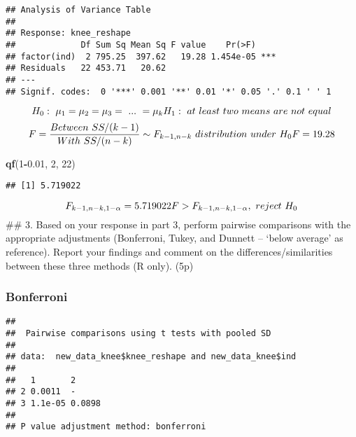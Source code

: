 \documentclass[]{article}
\newenvironment{Shaded}{\begin{snugshade}}{\end{snugshade}}
\newcommand{\KeywordTok}[1]{\textcolor[rgb]{0.13,0.29,0.53}{\textbf{#1}}}
\newcommand{\DataTypeTok}[1]{\textcolor[rgb]{0.13,0.29,0.53}{#1}}
\newcommand{\DecValTok}[1]{\textcolor[rgb]{0.00,0.00,0.81}{#1}}
\newcommand{\FloatTok}[1]{\textcolor[rgb]{0.00,0.00,0.81}{#1}}
\newcommand{\StringTok}[1]{\textcolor[rgb]{0.31,0.60,0.02}{#1}}
\newcommand{\OperatorTok}[1]{\textcolor[rgb]{0.81,0.36,0.00}{\textbf{#1}}}
\newcommand{\NormalTok}[1]{#1}
\begin{document}
\begin{verbatim}
## Analysis of Variance Table
## 
## Response: knee_reshape
##             Df Sum Sq Mean Sq F value    Pr(>F)    
## factor(ind)  2 795.25  397.62   19.28 1.454e-05 ***
## Residuals   22 453.71   20.62                      
## ---
## Signif. codes:  0 '***' 0.001 '**' 0.01 '*' 0.05 '.' 0.1 ' ' 1
\end{verbatim}

\[
H_{0}:\ \mu_{1} = \mu_{2} = \mu_{3} =\ ...\ =\mu_{k} \\
H_{1}:\ at\ least\ two\ means\ are\ not\ equal \\
\] \[
F = \frac{Between\ SS/(k-1)}{With\ SS/(n-k)}\sim F_{k-1,n-k}\ distribution\ under\ H_{0}\\
F = 19.28
\]

\begin{Shaded}
\begin{Highlighting}[]
\KeywordTok{qf}\NormalTok{(}\DecValTok{1}\OperatorTok{-}\FloatTok{0.01}\NormalTok{, }\DecValTok{2}\NormalTok{, }\DecValTok{22}\NormalTok{)}
\end{Highlighting}
\end{Shaded}

\begin{verbatim}
## [1] 5.719022
\end{verbatim}

\[
F_{k-1,n-k,1-\alpha}=5.719022\\
F > F_{k-1,n-k,1-\alpha},\ reject\ H_{0}
\] \#\# 3. Based on your response in part 3, perform pairwise
comparisons with the appropriate adjustments (Bonferroni, Tukey, and
Dunnett -- `below average' as reference). Report your findings and
comment on the differences/similarities between these three methods (R
only). (5p)

\subsubsection{Bonferroni}\label{bonferroni}

\begin{Shaded}
\end{Shaded}

\begin{verbatim}
## 
##  Pairwise comparisons using t tests with pooled SD 
## 
## data:  new_data_knee$knee_reshape and new_data_knee$ind 
## 
##   1       2     
## 2 0.0011  -     
## 3 1.1e-05 0.0898
## 
## P value adjustment method: bonferroni
\end{verbatim}
\end{document}
